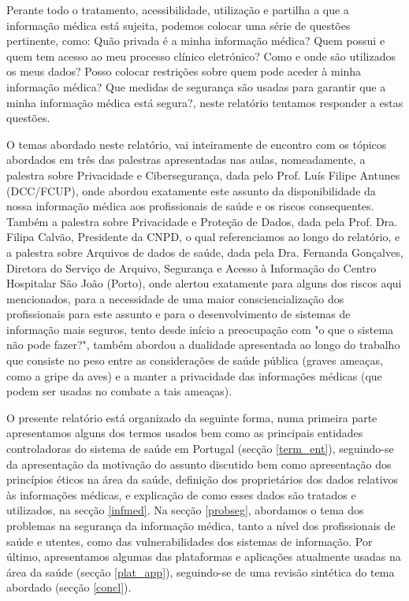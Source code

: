 \documentclass[conference]{IEEEtran}
\begin{document}
Perante todo o tratamento, acessibilidade, utilização e partilha a que a informação médica está sujeita, podemos colocar uma série de questões pertinente, como: Quão privada é a minha informação médica? Quem possui e quem tem acesso ao meu processo clínico eletrónico? Como e onde são utilizados os meus dados? Posso colocar restrições sobre quem pode aceder à minha informação médica? Que medidas de segurança são usadas para garantir que a minha informação médica está segura?, neste relatório tentamos responder a estas questões.

O temas abordado neste relatório, vai inteiramente de encontro com os tópicos abordados em três das palestras apresentadas nas aulas, nomeadamente, a palestra sobre Privacidade e Cibersegurança, dada pelo Prof. Luís Filipe Antunes (DCC/FCUP), onde abordou exatamente este assunto da disponibilidade da nossa informação médica aos profissionais de saúde e os riscos consequentes. Também a palestra sobre Privacidade e Proteção de Dados, dada pela Prof. Dra. Filipa Calvão, Presidente da CNPD, o qual referenciamos ao longo do relatório, e a palestra sobre Arquivos de dados de saúde, dada pela Dra. Fernanda Gonçalves, Diretora do Serviço de Arquivo, Segurança e Acesso à Informação do Centro Hospitalar São João (Porto), onde alertou exatamente para alguns dos riscos aqui mencionados, para a necessidade de uma maior consciencialização dos profissionais para este assunto e para o desenvolvimento de sistemas de informação mais seguros, tento desde início a preocupação com "o que o sistema não pode fazer?", também abordou a dualidade apresentada ao longo do trabalho que consiste no peso entre as considerações de saúde pública (graves ameaças, como a gripe da aves) e a manter a privacidade das informações médicas (que podem ser usadas no combate a tais ameaças).

O presente relatório está organizado da seguinte forma, numa primeira parte apresentamos alguns dos termos usados bem como as principais entidades controladoras do sistema de saúde em Portugal (secção \ref{term_ent}), seguindo-se da apresentação da motivação do assunto discutido bem como apresentação dos princípios éticos na área da saúde, definição dos proprietários dos dados relativos às informações médicas, e explicação de como esses dados são tratados e utilizados, na secção \ref{infmed}. Na secção \ref{probseg}, abordamos o tema dos problemas na segurança da informação médica, tanto a nível dos profissionais de saúde e utentes, como das vulnerabilidades dos sistemas de informação. Por último, apresentamos algumas das plataformas e aplicações atualmente usadas na área da saúde (secção \ref{plat_app}), seguindo-se de uma revisão sintética do tema abordado (secção \ref{concl}).
\end{document}
